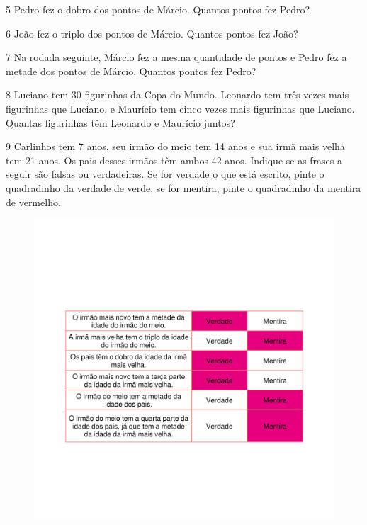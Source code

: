 \num{5} Pedro fez o dobro dos pontos de Márcio. Quantos pontos fez Pedro?


\num{6} João fez o triplo dos pontos de Márcio. Quantos pontos fez João?


\num{7} Na rodada seguinte, Márcio fez a mesma quantidade de pontos e Pedro
  fez a metade dos pontos de Márcio. Quantos pontos fez Pedro?


\num{8} Luciano tem 30 figurinhas da Copa do Mundo. Leonardo tem três
vezes mais figurinhas que Luciano, e Maurício tem cinco vezes mais figurinhas que Luciano.
Quantas figurinhas têm Leonardo e Maurício juntos?




\num{9} Carlinhos tem 7 anos, seu irmão do meio tem 14 anos e sua irmã mais
velha tem 21 anos. Os pais desses irmãos têm ambos 42 anos. Indique se
as frases a seguir são falsas ou verdadeiras. Se for verdade o que está
escrito, pinte o quadradinho da verdade de verde; se for mentira,
pinte o quadradinho da mentira de vermelho.

\begin{figure}[htpb!]
\includegraphics[width=\textwidth]{./media/image109_prof.png}
\end{figure}

